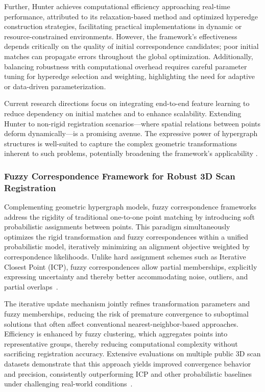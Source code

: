 \documentclass[sigconf]{acmart}
\begin{document}
Further, Hunter achieves computational efficiency approaching real-time performance, attributed to its relaxation-based method and optimized hyperedge construction strategies, facilitating practical implementations in dynamic or resource-constrained environments. However, the framework’s effectiveness depends critically on the quality of initial correspondence candidates; poor initial matches can propagate errors throughout the global optimization. Additionally, balancing robustness with computational overhead requires careful parameter tuning for hyperedge selection and weighting, highlighting the need for adaptive or data-driven parameterization.

Current research directions focus on integrating end-to-end feature learning to reduce dependency on initial matches and to enhance scalability. Extending Hunter to non-rigid registration scenarios—where spatial relations between points deform dynamically—is a promising avenue. The expressive power of hypergraph structures is well-suited to capture the complex geometric transformations inherent to such problems, potentially broadening the framework’s applicability \cite{ref6}.

\subsubsection{Fuzzy Correspondence Framework for Robust 3D Scan Registration}

Complementing geometric hypergraph models, fuzzy correspondence frameworks address the rigidity of traditional one-to-one point matching by introducing soft probabilistic assignments between points. This paradigm simultaneously optimizes the rigid transformation and fuzzy correspondences within a unified probabilistic model, iteratively minimizing an alignment objective weighted by correspondence likelihoods. Unlike hard assignment schemes such as Iterative Closest Point (ICP), fuzzy correspondences allow partial memberships, explicitly expressing uncertainty and thereby better accommodating noise, outliers, and partial overlaps~\cite{ref5}.

The iterative update mechanism jointly refines transformation parameters and fuzzy memberships, reducing the risk of premature convergence to suboptimal solutions that often affect conventional nearest-neighbor-based approaches. Efficiency is enhanced by fuzzy clustering, which aggregates points into representative groups, thereby reducing computational complexity without sacrificing registration accuracy. Extensive evaluations on multiple public 3D scan datasets demonstrate that this approach yields improved convergence behavior and precision, consistently outperforming ICP and other probabilistic baselines under challenging real-world conditions~\cite{ref5}.
\end{document}

